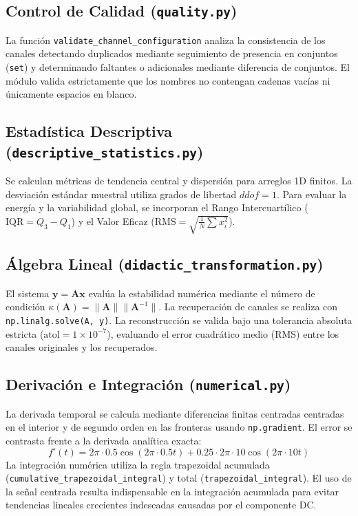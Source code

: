 \documentclass[11pt,a4paper]{article}
\begin{document}
\subsection{Control de Calidad (\texttt{quality.py})}
La función \texttt{validate\_channel\_configuration} analiza la consistencia de los canales detectando duplicados mediante seguimiento de presencia en conjuntos (\texttt{set}) y determinando faltantes o adicionales mediante diferencia de conjuntos. El módulo valida estrictamente que los nombres no contengan cadenas vacías ni únicamente espacios en blanco.

\subsection{Estadística Descriptiva (\texttt{descriptive\_statistics.py})}
Se calculan métricas de tendencia central y dispersión para arreglos 1D finitos. La desviación estándar muestral utiliza grados de libertad $ddof = 1$. Para evaluar la energía y la variabilidad global, se incorporan el Rango Intercuartílico ($\text{IQR} = Q_3 - Q_1$) y el Valor Eficaz ($\text{RMS} = \sqrt{\frac{1}{N}\sum x_i^2}$).

\subsection{Álgebra Lineal (\texttt{didactic\_transformation.py})}
El sistema $\mathbf{y} = \mathbf{A} \mathbf{x}$ evalúa la estabilidad numérica mediante el número de condición $\kappa(\mathbf{A}) = \|\mathbf{A}\| \|\mathbf{A}^{-1}\|$. La recuperación de canales se realiza con \texttt{np.linalg.solve(A, y)}. La reconstrucción se valida bajo una tolerancia absoluta estricta ($\text{atol} = 1\times 10^{-7}$), evaluando el error cuadrático medio (RMS) entre los canales originales y los recuperados.

\subsection{Derivación e Integración (\texttt{numerical.py})}
La derivada temporal se calcula mediante diferencias finitas centradas centradas en el interior y de segundo orden en las fronteras usando \texttt{np.gradient}. El error se contrasta frente a la derivada analítica exacta:
\begin{equation}
    f'(t) = 2\pi \cdot 0.5 \cos(2\pi \cdot 0.5 t) + 0.25 \cdot 2\pi \cdot 10 \cos(2\pi \cdot 10 t)
\end{equation}
La integración numérica utiliza la regla trapezoidal acumulada (\texttt{cumulative\_trapezoidal\_integral}) y total (\texttt{trapezoidal\_integral}). El uso de la señal centrada resulta indispensable en la integración acumulada para evitar tendencias lineales crecientes indeseadas causadas por el componente DC.
\end{document}
